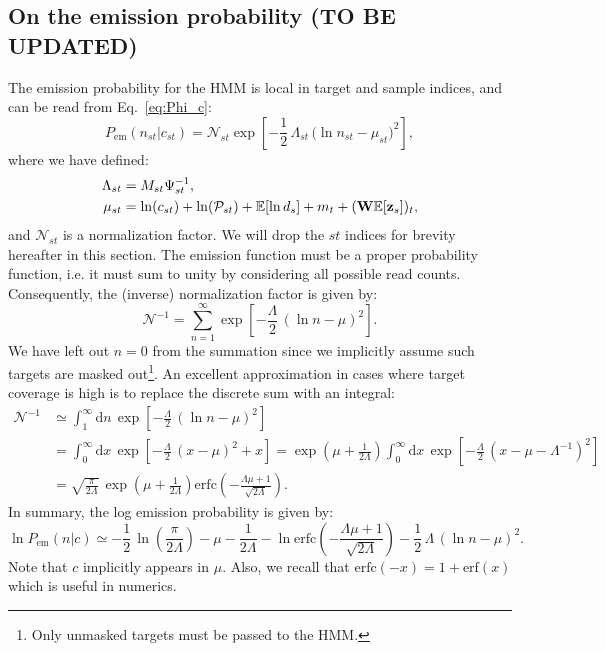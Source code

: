\documentclass[nofootinbib,amssymb,amsmath]{revtex4}
\newcommand{\vz}{{\bf z}}
\newcommand{\vW}{{\bf W}}
\newcommand{\PP}{\mathcal{P}}
\newcommand{\EE}{\mathbb{E}}
\begin{document}
\subsection{On the emission probability (TO BE UPDATED)}
The emission probability for the HMM is local in target and sample indices, and can be read from Eq.~\eqref{eq:Phi_c}:
\begin{equation}
P_\mathrm{em}(n_{st}|c_{st}) = \mathcal{N}_{st} \exp\left[- \frac{1}{2} \, \Lambda_{st} \, \big(\ln n_{st} - \mu_{st}\big)^2\right],
\end{equation}
where we have defined:
\begin{align}
\Lambda_{st} &= M_{st}\Psi_{st}^{-1},\nonumber\\
\mu_{st} &= \ln(c_{st}) + \ln(\PP_{st}) + \EE[\ln d_s] + m_t + (\vW \EE[\vz_s])_t,
\end{align}
and $\mathcal{N}_{st}$ is a normalization factor. We will drop the $st$ indices for brevity hereafter in this section. The emission function must be a proper probability function, i.e. it must sum to unity by considering all possible read counts. Consequently, the (inverse) normalization factor is given by:
\begin{equation}
\mathcal{N}^{-1} = \sum_{n=1}^\infty \exp\left[-\frac{\Lambda}{2}\,(\ln n - \mu)^2\right].
\end{equation}
We have left out $n=0$ from the summation since we implicitly assume such targets are masked out\footnote{Only unmasked targets must be passed to the HMM.}. An excellent approximation in cases where target coverage is high is to replace the discrete sum with an integral:
\begin{align}
\mathcal{N}^{-1} &\simeq \int_{1}^\infty \mathrm{d}n\,\exp\left[-\frac{\Lambda}{2}\,(\ln n - \mu)^2\right]\nonumber\\
&= \int_{0}^\infty \mathrm{d}x \, \exp\left[-\frac{\Lambda}{2}\,(x - \mu)^2 + x\right] = \exp\left(\mu + \frac{1}{2\Lambda}\right)\int_{0}^\infty \mathrm{d}x \, \exp\left[-\frac{\Lambda}{2}\,(x - \mu - \Lambda^{-1})^2\right]\nonumber\\
&= \sqrt{\frac{\pi}{2\Lambda}}\,\exp\left(\mu + \frac{1}{2\Lambda}\right) \mathrm{erfc}\left(-\frac{\Lambda \mu + 1}{\sqrt{2\Lambda}}\right).
\end{align}
In summary, the log emission probability is given by:
\begin{equation}
\ln P_{\mathrm{em}}(n|c) \simeq -\frac{1}{2}\,\ln\left(\frac{\pi}{2\Lambda}\right) - \mu - \frac{1}{2\Lambda} - \ln \mathrm{erfc}\left(-\frac{\Lambda \mu + 1}{\sqrt{2\Lambda}}\right) - \frac{1}{2}\,\Lambda\,(\ln n - \mu)^2.
\end{equation}
Note that $c$ implicitly appears in $\mu$. Also, we recall that $\mathrm{erfc}(-x) = 1 + \mathrm{erf}(x)$ which is useful in numerics.
\end{document}
